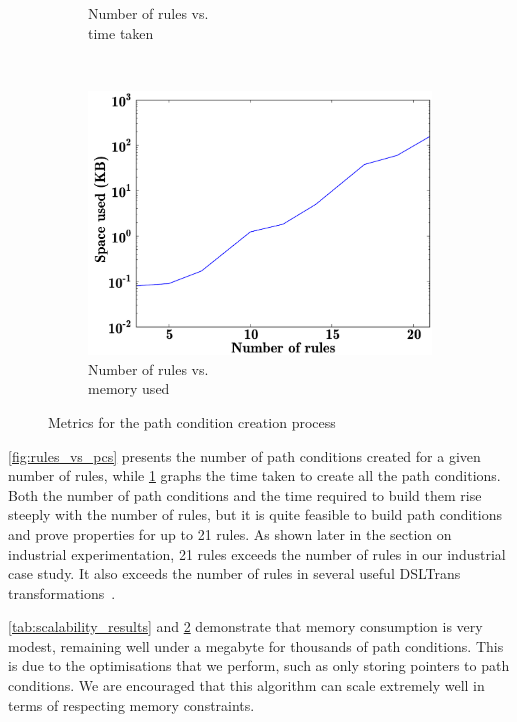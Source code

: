 \begin{figure}[htb]
\begin{subfigure}[b]{0.26\textwidth}
                \caption{Number of rules vs. \\time taken}
                \label{fig:rules_vs_time}
        \end{subfigure}%
        ~~
        \begin{subfigure}[b]{0.26\textwidth}
                \centering
                \includegraphics[width=1\textwidth]{./figures/results/rules_vs_memory.pdf}
                \caption{Number of rules vs. \\memory used}
                \label{fig:rules_vs_memory}
        \end{subfigure}%

        \caption{Metrics for the path condition creation process}
        \label{fig:path_condition_building}
\end{figure}



\cref{fig:rules_vs_pcs} presents the number of path conditions created for
a given number of rules, while \cref{fig:rules_vs_time} graphs the time
taken to create all the path conditions. Both the number of path conditions and
the time required to build them rise steeply with the number of rules, but it
is quite feasible to build path conditions and prove properties for up to 21
rules. As shown later in the section on industrial experimentation, 21 rules
exceeds the number of rules in our industrial case study. It also exceeds the
number of rules in several useful DSLTrans
transformations~\cite{febavava:10,dsltrans_manual,zhang:ACP_APN:11}.

\cref{tab:scalability_results} and \cref{fig:rules_vs_memory} demonstrate that memory consumption is very modest, remaining well under a megabyte for thousands of path conditions. This is due to the optimisations that we perform, such as only storing pointers to path conditions. We are encouraged that this algorithm can scale extremely well in terms of respecting memory constraints.


